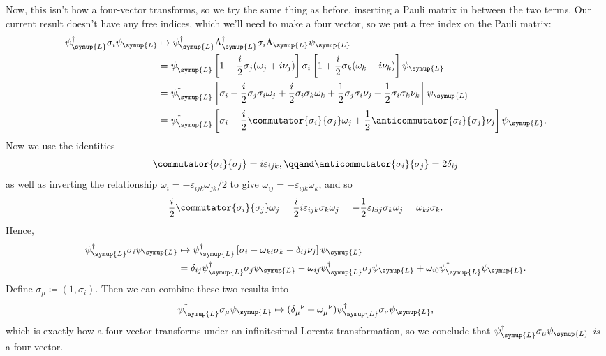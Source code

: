 \documentclass[fleqn]{NotesClass}
\newcommand{\hermit}{\dagger}
\newcommand{\Left}{\symup{L}}
\begin{document}
    Now, this isn't how a four-vector transforms, so we try the same thing as before, inserting a Pauli matrix in between the two terms.
    Our current result doesn't have any free indices, which we'll need to make a four vector, so we put a free index on the Pauli matrix:
    \begin{align}
        \psi_{\Left}^\hermit \sigma_i \psi_{\Left} &\mapsto \psi_{\Left}^\hermit\Lambda_{\Left}^\hermit \sigma_i \Lambda_{\Left}\psi_{\Left}\\
        &= \psi_{\Left}^\hermit \left[ 1 - \frac{i}{2} \sigma_j(\omega_j + i\nu_j) \right] \sigma_i \left[ 1 + \frac{i}{2} \sigma_k(\omega_k - i\nu_k) \right] \psi_{\Left}\\
        &= \psi_{\Left}^\hermit \left[ \sigma_i - \frac{i}{2}\sigma_j\sigma_i\omega_j + \frac{i}{2}\sigma_i\sigma_k\omega_k + \frac{1}{2}\sigma_j\sigma_i\nu_j + \frac{1}{2}\sigma_i\sigma_k\nu_k \right]\psi_{\Left}\\
        &= \psi_{\Left}^\hermit \left[ \sigma_i - \frac{i}{2}\commutator{\sigma_i}{\sigma_j}\omega_j + \frac{1}{2}\anticommutator{\sigma_i}{\sigma_j} \nu_j \right] \psi_{\Left}.
    \end{align}
    Now we use the identities
    \begin{equation}
        \commutator{\sigma_i}{\sigma_j} = i\varepsilon_{ijk}, \qqand \anticommutator{\sigma_i}{\sigma_j} = 2\delta_{ij}
    \end{equation}
    as well as inverting the relationship \(\omega_i = -\varepsilon_{ijk}\omega_{jk}/2\) to give \(\omega_{ij} = -\varepsilon_{ijk}\omega_k\), and so
    \begin{equation}
        \frac{i}{2}\commutator{\sigma_i}{\sigma_j}\omega_j = \frac{i}{2}i\varepsilon_{ijk}\sigma_k \omega_j = -\frac{1}{2}\varepsilon_{kij}\sigma_k \omega_j = \omega_{ki} \sigma_k.
    \end{equation}
    Hence,
    \begin{align}
        \psi_{\Left}^\hermit \sigma_i \psi_{\Left} &\mapsto \psi_{\Left}^\hermit \left[ \sigma_i - \omega_{ki} \sigma_k + \delta_{ij}\nu_j \right] \psi_{\Left}\\
        &= \delta_{ij}\psi_{\Left}^\hermit \sigma_j\psi_{\Left} - \omega_{ij} \psi_{\Left}^\hermit \sigma_j \psi_{\Left} + \omega_{i0}\psi_{\Left}^\hermit \psi_{\Left}.
    \end{align}
    Define \(\sigma_\mu \coloneqq (1, \sigma_i)\).
    Then we can combine these two results into
    \begin{equation}
        \psi_{\Left}^\hermit \sigma_\mu \psi_{\Left} \mapsto (\tensor{\delta}{_\mu^\nu} + \tensor{\omega}{_\mu^\nu})\psi_{\Left}^\hermit \sigma_\nu \psi_{\Left},
    \end{equation}
    which is exactly how a four-vector transforms under an infinitesimal Lorentz transformation, so we conclude that \(\psi_{\Left}^\hermit \sigma_\mu \psi_{\Left}\) \emph{is} a four-vector.
    
\end{document}

